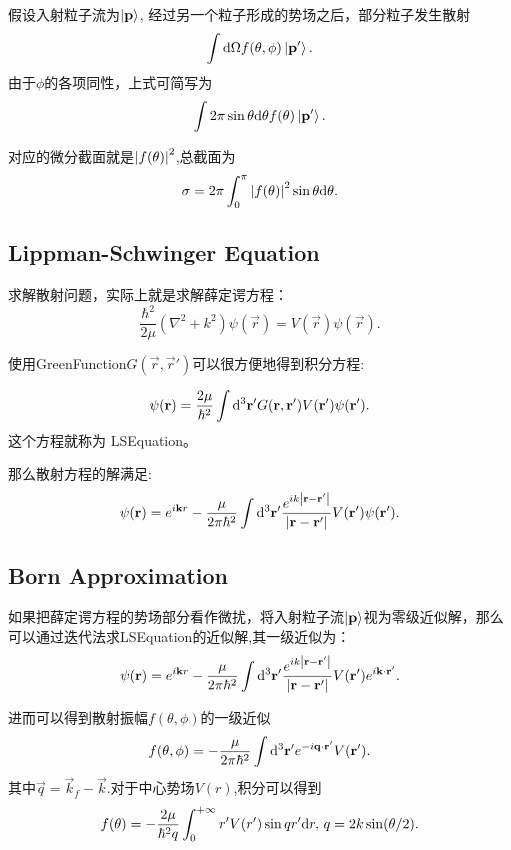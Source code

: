假设入射粒子流为$\left|\mathbf{p}\right>$, 经过另一个粒子形成的势场之后，部分粒子发生散射$$\int\mathrm{d}\Omega f(\theta,\phi)\left|\mathbf{p}'\right>.$$
由于$\phi$的各项同性，上式可简写为
\begin{equation}
    \int 2\pi\sin\theta\mathrm{d}\theta f(\theta)\left|\mathbf{p}'\right>.
\end{equation}

对应的微分截面就是$\left|f(\theta)\right|^2$,总截面为
\begin{equation}
    \sigma=2\pi\int_0^\pi\left|f(\theta)\right|^2\sin\theta\mathrm{d}\theta.
\end{equation}

\subsection{Lippman-Schwinger Equation}
求解散射问题，实际上就是求解薛定谔方程：
\begin{equation}
    \frac{\hbar^2}{2\mu}(\nabla^2+k^2)\psi(\vec{r})=V(\vec{r})\psi(\vec{r}).
\end{equation}

使用\gls{GreenFunction}$G(\vec{r},\vec{r}')$可以很方便地得到积分方程:

\begin{equation}
    \psi(\mathbf{r})=\frac{2\mu}{\hbar^2}\int\mathrm{d}^3\mathbf{r}'G(\mathbf{r},\mathbf{r}')V(\mathbf{r}')\psi(\mathbf{r}').
\end{equation}
这个方程就称为 \gls{LSEquation}。

那么散射方程的解满足:
\begin{equation}
    \psi(\mathbf{r})=e^{i\mathbf{k}r}-\frac{\mu}{2\pi\hbar^2}\int\mathrm{d}^3\mathbf{r}'\frac{e^{ik\left|\mathbf{r}-\mathbf{r}'\right|}}{\left|\mathbf{r}-\mathbf{r}'\right|}V(\mathbf{r}')\psi(\mathbf{r}').
\end{equation}

\subsection{Born Approximation}
如果把薛定谔方程的势场部分看作微扰，将入射粒子流$\left|\mathbf{p}\right>$视为零级近似解，那么可以通过迭代法求\gls{LSEquation}的近似解,其一级近似为：
\begin{equation}
    \psi(\mathbf{r})=e^{i\mathbf{k}r}-\frac{\mu}{2\pi\hbar^2}\int\mathrm{d}^3\mathbf{r}'\frac{e^{ik\left|\mathbf{r}-\mathbf{r}'\right|}}{\left|\mathbf{r}-\mathbf{r}'\right|}V(\mathbf{r}')e^{i\mathbf{k}\cdot\mathbf{r}'}.
\end{equation}

进而可以得到散射振幅$f(\theta,\phi)$的一级近似
\begin{equation}
    f(\theta,\phi)=-\frac{\mu}{2\pi\hbar^2}\int\mathrm{d}^3\mathbf{r}'e^{-i\mathbf{q}\cdot\mathbf{r}'}V(\mathbf{r}').
\end{equation}
其中$\vec{q}=\vec{k}_f-\vec{k}$.对于中心势场$V(r)$,积分可以得到
\begin{equation}
    f(\theta)=-\frac{2\mu}{\hbar^2q}\int_0^{+\infty}r'V(r')\sin qr'\mathrm{d} r, \, q=2k\sin(\theta/2).
\end{equation}

